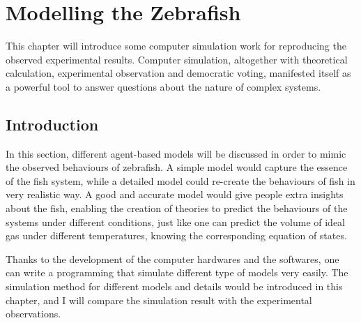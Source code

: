 \documentclass[11pt,twoside]{report}
\begin{document}
\chapter{Modelling the Zebrafish}

This chapter will introduce some computer simulation work for reproducing the observed experimental results. Computer simulation, altogether with theoretical calculation, experimental observation and democratic voting, manifested itself as a powerful tool to answer questions about the nature of complex systems.

\section{Introduction}

In this section, different agent-based models will be discussed in order to mimic the observed behaviours of zebrafish. A simple model would capture the essence of the fish system, while a detailed model could re-create the behaviours of fish in very realistic way. A good and accurate model would give people extra insights about the fish, enabling the creation of theories to predict the behaviours of the systems under different conditions, just like one can predict the volume of ideal gas under different temperatures, knowing the corresponding equation of states.

Thanks to the development of the computer hardwares and the softwares, one can write a programming that simulate different type of models very easily. The simulation method for different models and details would be introduced in this chapter, and I will compare the simulation result with the experimental observations.

\printbibliography
\end{document}
